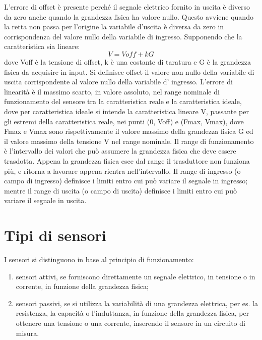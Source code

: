 \documentclass[a4paper,12pt]{article}
\begin{document}
L'errore di offset è presente perché il segnale elettrico fornito in uscita è diverso da zero anche quando la grandezza fisica ha valore nullo. Questo avviene quando la retta non passa per l'origine la variabile d'uscita è diversa da zero in corrispondenza del valore nullo della variabile di ingresso. Supponendo che la caratteristica sia lineare:
\begin{equation}
V = Voff + k G
\end{equation}
dove Voff è la tensione di offset, k è una costante di taratura e G è la grandezza fisica da acquisire in input. Si definisce offset il valore non nullo della variabile di uscita corrispondente al valore nullo della variabile d' ingresso.
L'errore di linearità è il massimo scarto, in valore assoluto, nel range nominale di funzionamento del sensore tra la caratteristica reale e la caratteristica ideale, dove per caratteristica ideale si intende la caratteristica lineare V, passante per gli estremi della caratteristica reale, nei punti (0, Voff) e (Fmax, Vmax), dove Fmax e Vmax sono rispettivamente il valore massimo della grandezza fisica G ed il valore massimo della tensione V nel range nominale. Il range di funzionamento è l'intervallo dei valori che può assumere la grandezza fisica che deve essere trasdotta. Appena la grandezza fisica esce dal range il trasduttore non funziona più, e ritorna a lavorare appena rientra nell'intervallo. Il range di ingresso (o campo di ingresso) definisce i limiti entro cui può variare il segnale in ingresso; mentre il range di uscita (o campo di uscita) definisce i limiti entro cui può variare il segnale in uscita. 

\section{Tipi di sensori}
I sensori si distinguono in base al principio di funzionamento:
\begin{enumerate}
\item sensori attivi, se forniscono direttamente un segnale elettrico, in tensione o in corrente, in funzione della grandezza fisica;
\item sensori passivi, se si utilizza la variabilità di una grandezza elettrica, per es. la resistenza, la capacità o l'induttanza, in funzione della grandezza fisica, per ottenere una tensione o una corrente, inserendo il sensore in un circuito di misura.  
\end{enumerate}
\end{document}
